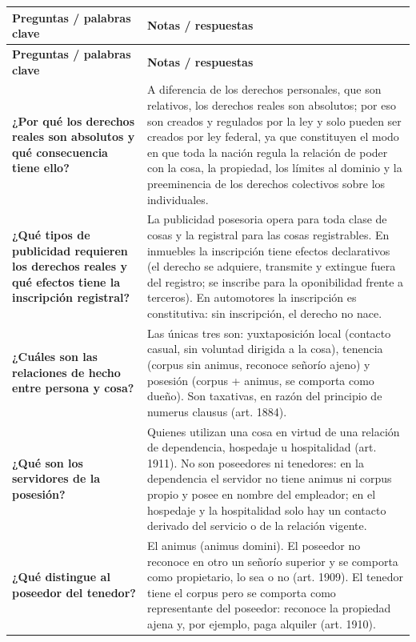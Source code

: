 \documentclass[12pt,oneside]{book}
\begin{document}
\begin{longtable}{@{}>{\raggedright\arraybackslash}p{}>{\raggedright\arraybackslash}p{}@{}}
\toprule
\textbf{Preguntas / palabras clave} & \textbf{Notas / respuestas} \\
\midrule
\endfirsthead
\toprule
\textbf{Preguntas / palabras clave} & \textbf{Notas / respuestas} \\
\midrule
\endhead

\textbf{¿Por qué los derechos reales son absolutos y qué consecuencia tiene ello?} &
A diferencia de los derechos personales, que son relativos, los derechos reales son absolutos; por eso son creados y regulados por la ley y solo pueden ser creados por ley federal, ya que constituyen el modo en que toda la nación regula la relación de poder con la cosa, la propiedad, los límites al dominio y la preeminencia de los derechos colectivos sobre los individuales. \\
\midrule

\textbf{¿Qué tipos de publicidad requieren los derechos reales y qué efectos tiene la inscripción registral?} &
La publicidad posesoria opera para toda clase de cosas y la registral para las cosas registrables. En inmuebles la inscripción tiene efectos declarativos (el derecho se adquiere, transmite y extingue fuera del registro; se inscribe para la oponibilidad frente a terceros). En automotores la inscripción es constitutiva: sin inscripción, el derecho no nace. \\
\midrule

\textbf{¿Cuáles son las relaciones de hecho entre persona y cosa?} &
Las únicas tres son: yuxtaposición local (contacto casual, sin voluntad dirigida a la cosa), tenencia (corpus sin animus, reconoce señorío ajeno) y posesión (corpus + animus, se comporta como dueño). Son taxativas, en razón del principio de numerus clausus (art. 1884). \\
\midrule

\textbf{¿Qué son los servidores de la posesión?} &
Quienes utilizan una cosa en virtud de una relación de dependencia, hospedaje u hospitalidad (art. 1911). No son poseedores ni tenedores: en la dependencia el servidor no tiene animus ni corpus propio y posee en nombre del empleador; en el hospedaje y la hospitalidad solo hay un contacto derivado del servicio o de la relación vigente. \\
\midrule

\textbf{¿Qué distingue al poseedor del tenedor?} &
El animus (animus domini). El poseedor no reconoce en otro un señorío superior y se comporta como propietario, lo sea o no (art. 1909). El tenedor tiene el corpus pero se comporta como representante del poseedor: reconoce la propiedad ajena y, por ejemplo, paga alquiler (art. 1910). \\
\midrule


\end{longtable}
\end{document}
